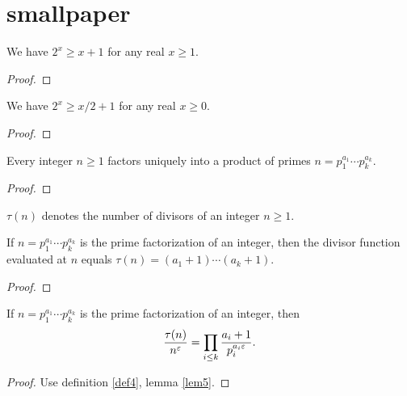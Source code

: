 \chapter{smallpaper}
\begin{lemma}\label{lem1} \leanok
We have $2^x \ge x+1$ for any real $x\ge1$.
\end{lemma}
\begin{proof}
\leanok
\end{proof}

\begin{lemma}\label{lem2} 
We have $2^x \ge x/2+1$ for any real $x\ge0$.
\end{lemma}
\begin{proof}
\leanok
\end{proof}


\begin{theorem} \label{thm3} \leanok
Every integer $n\ge1$ factors uniquely into a product of primes $n = p_1^{a_1}\cdots p_k^{a_k}$.
\end{theorem}
\begin{proof}
\leanok
\end{proof}

\begin{definition} \label{def4} \leanok
$\tau(n)$ denotes the number of divisors of an integer $n\ge1$.
\end{definition}

\begin{lemma} \label{lem5} \leanok
If $n = p_1^{a_1}\cdots p_k^{a_k}$ is the prime factorization of an integer, then the divisor function evaluated at $n$ equals $\tau(n) = (a_1+1)\cdots(a_k+1)$.
\end{lemma}
\begin{proof}
\leanok
\end{proof}

\begin{lemma} \label{lem6} 
If $n = p_1^{a_1}\cdots p_k^{a_k}$ is the prime factorization of an integer, then
\begin{equation}\label{eq:taunn}
\frac{\tau(n)}{n^\varepsilon} = \prod_{i\le k}\frac{a_i+1}{p_i^{a_i \varepsilon}}.
\end{equation}
\end{lemma}
\begin{proof}\leanok
{}
Use definition \ref{def4}, lemma \ref{lem5}.
\end{proof}


